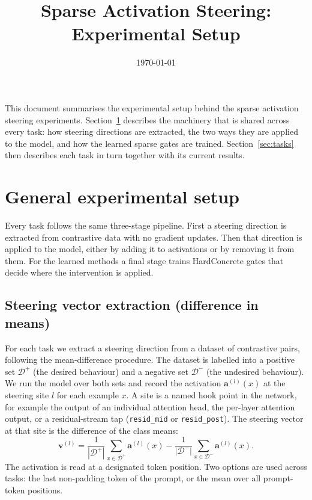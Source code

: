 \documentclass[a4paper,11pt]{article}
\title{\vspace{-1.5cm}\textbf{Sparse Activation Steering: Experimental Setup}}
\author{}
\date{\today}
\begin{document}
\maketitle
\vspace{-1cm}

This document summarises the experimental setup behind the sparse activation steering experiments. Section~\ref{sec:general} describes the machinery that is shared across every task: how steering directions are extracted, the two ways they are applied to the model, and how the learned sparse gates are trained. Section~\ref{sec:tasks} then describes each task in turn together with its current results.

\section{General experimental setup}\label{sec:general}

Every task follows the same three-stage pipeline. First a steering direction is extracted from contrastive data with no gradient updates. Then that direction is applied to the model, either by adding it to activations or by removing it from them. For the learned methods a final stage trains HardConcrete gates that decide where the intervention is applied.

\subsection{Steering vector extraction (difference in means)}

For each task we extract a steering direction from a dataset of contrastive pairs, following the mean-difference procedure. The dataset is labelled into a positive set $\mathcal{D}^+$ (the desired behaviour) and a negative set $\mathcal{D}^-$ (the undesired behaviour). We run the model over both sets and record the activation $\mathbf{a}^{(l)}(x)$ at the steering site $l$ for each example $x$. A site is a named hook point in the network, for example the output of an individual attention head, the per-layer attention output, or a residual-stream tap (\texttt{resid\_mid} or \texttt{resid\_post}). The steering vector at that site is the difference of the class means:
\begin{equation}\label{eq:diffmeans}
    \mathbf{v}^{(l)} = \frac{1}{|\mathcal{D}^+|}\sum_{x \in \mathcal{D}^+} \mathbf{a}^{(l)}(x) - \frac{1}{|\mathcal{D}^-|}\sum_{x \in \mathcal{D}^-} \mathbf{a}^{(l)}(x).
\end{equation}
The activation is read at a designated token position. Two options are used across tasks: the last non-padding token of the prompt, or the mean over all prompt-token positions.
\end{document}
